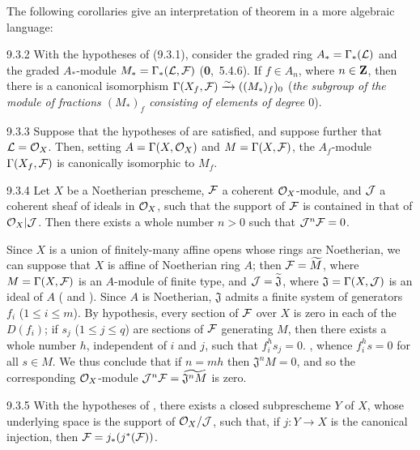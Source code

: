 \documentclass[../main.tex]{subfiles}
\begin{document}
The following
corollaries give an interpretation of theorem  in a more algebraic
language:

\begin{env}[Corollary]{9.3.2} With the hypotheses of {\normalfont(9.3.1)},
consider the graded ring $A_\ast=\Gamma_\ast(\mathcal{L})$ and the graded
$A_\ast$-module $M_\ast=\Gamma_\ast(\mathcal{L},\mathcal{F})$
{\normalfont(\textbf{0},~5.4.6)}.  If $f\in A_n$, where $n\in\mathbf{Z}$, then there is
a canonical isomorphism $\Gamma(X_f,\mathcal{F})\xrightarrow{\sim}((M_\ast)_f)_0$
(\emph{the subgroup of the module of fractions $(M_\ast)_f$ consisting of
elements of degree $0$}).
\end{env}

\begin{env}[Corollary]{9.3.3} Suppose that
the hypotheses of  are satisfied, and suppose further that
$\mathcal{L}=\mathcal{O}_X$.  Then, setting $A=\Gamma(X,\mathcal{O}_X)$ and $M=\Gamma(X,\mathcal{F})$,
the $A_f$-module $\Gamma(X_f,\mathcal{F})$ is canonically isomorphic to $M_f$.
\end{env}

\begin{env}[Proposition]{9.3.4} Let $X$ be a Noetherian prescheme,
$\mathcal{F}$ a coherent $\mathcal{O}_X$-module, and $\mathcal{J}$ a coherent sheaf of ideals
in $\mathcal{O}_X$, such that the support of $\mathcal{F}$ is contained in that of
$\mathcal{O}_X|\mathcal{J}$.  Then there exists a whole number $n>0$ such that
$\mathcal{J}^n\mathcal{F}=0$.
\end{env}

Since $X$ is a union of finitely-many affine opens whose rings are Noetherian,
we can suppose that $X$ is affine of Noetherian ring $A$; then
$\mathcal{F}=\widetilde{M}$, where $M=\Gamma(X,\mathcal{F})$ is an $A$-module of
finite type, and $\mathcal{J}=\widetilde{\mathfrak{J}}$, where
$\mathfrak{J}=\Gamma(X,\mathcal{J})$ is an ideal of $A$ ( and
).  Since $A$ is Noetherian, $\mathfrak{J}$ admits a finite system
of generators $f_i$ ($1\leq i\leq m$).  By hypothesis, every section of
$\mathcal{F}$ over $X$ is zero in each of the $D(f_i)$; if $s_j$ ($1\leq j\leq q$)
are sections of $\mathcal{F}$ generating $M$, then there exists a whole number
$h$, independent of $i$ and $j$, such that $f_i^h s_j=0$. , whence
$f_i^h s=0$ for all $s\in M$.  We thus conclude that if $n=mh$ then
$\mathfrak{J}^n M=0$, and so the corresponding $\mathcal{O}_X$-module
$\mathcal{J}^n\mathcal{F}=\widetilde{\mathfrak{J}^n M}$  is zero.

\begin{env}[Corollary]{9.3.5} With the hypotheses of , there exists
a closed subprescheme $Y$ of $X$, whose underlying space is the support of
$\mathcal{O}_X/\mathcal{J}$, such that, if $j\colon Y\to X$ is the canonical injection,
then $\mathcal{F}=j_\ast(j^\ast(\mathcal{F}))$.
\end{env}
\end{document}
